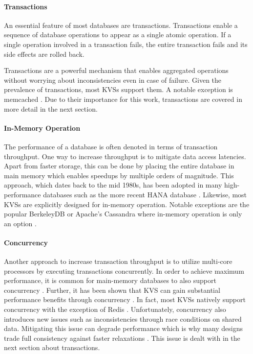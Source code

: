 \paragraph{Transactions}

An essential feature of most databases are transactions. Transactions enable a
sequence of database operations to appear as a single atomic operation. If a
single operation involved in a transaction fails, the entire transaction fails
and its side effects are rolled back.

Transactions are a powerful mechanism that enables aggregated operations without
worrying about inconsistencies even in case of failure. Given the prevalence of
transactions, most \acp{KVS} support them. A notable exception is memcached
\cite{wu2016nvmcached}. Due to their importance for this work, transactions are
covered in more detail in the next section.

\paragraph{In-Memory Operation}

The performance of a database is often denoted in terms of transaction
throughput. One way to increase throughput is to mitigate data access latencies.
Apart from faster storage, this can be done by placing the entire database in
main memory which enables speedups by multiple orders of magnitude. This
approach, which dates back to the mid 1980s, has been adopted in many
high-performance databases such as the more recent HANA database
\cite{molina1992main, faerber2012hana}. Likewise, most \acp{KVS} are explicitly
designed for in-memory operation. Notable exceptions are the popular BerkeleyDB
or Apache's Cassandra where in-memory operation is only an option
\cite{bdb2017doc, lakshman2010cassandra}.

\paragraph{Concurrency}

Another approach to increase transaction throughput is to utilize multi-core
processors by executing transactions concurrently. In order to achieve maximum
performance, it is common for main-memory databases to also support concurrency
\cite{grund2010hyrise, faerber2012hana, diaconu2013hekaton}. Further, it has
been shown that \ac{KVS} can gain substantial performance benefits through
concurrency \cite{fan2013memc3, li2015architecting, xu2014building}. In fact,
most \acp{KVS} natively support concurrency with the exception of Redis
\cite{redis2017home}. Unfortunately, concurrency also introduces new issues such
as inconsistencies through race conditions on shared data. Mitigating this issue
can degrade performance which is why many designs trade full consistency against
faster relaxations \cite{decandia2007dynamo}. This issue is dealt with in the
next section about transactions.

